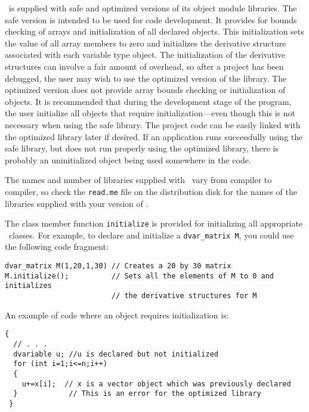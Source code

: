 \documentclass{admbmanual}
\begin{document}
\scAD\ is supplied with safe and optimized versions of its object module
libraries. The safe version is intended to be used for code development. It
provides for bounds checking of arrays and initialization of all declared
objects. This initialization sets the value of all array members to zero and
initializes the derivative structure associated with each variable type object.
The initialization of the derivative structures can involve a fair amount of
overhead, so after a project has been debugged, the user may wish to use the
optimized version of the library. The optimized version does not provide array
bounds checking or initialization of objects. It is recommended that during the
development stage of the program, the user initialize all objects that require
initialization---even though this is not necessary when using the safe library.
The project code can be easily linked with the optimized library later if
desired. If an application runs successfully using the safe library, but does
not run properly using the optimized library, there is probably an uninitialized
object being used somewhere in the code.

The names and number of libraries supplied with \scAD\ vary from compiler to
compiler, so check the \texttt{read.me} file on the distribution disk for the
names of the libraries supplied with your version of \scAD.

The class member function \texttt{initialize} is provided for initializing all
appropriate \scAD\ classes. For example, to declare and initialize a
\texttt{dvar\_matrix M}, you could use the following code fragment:
\begin{lstlisting}
dvar_matrix M(1,20,1,30) // Creates a 20 by 30 matrix
M.initialize();          // Sets all the elements of M to 0 and initializes
                         // the derivative structures for M
\end{lstlisting}

An example of code where an object requires initialization is:
\begin{lstlisting}
{
  // . . .
  dvariable u; //u is declared but not initialized
  for (int i=1;i<=n;i++)
  {
    u+=x[i];  // x is a vector object which was previously declared
  }            // This is an error for the optimized library
 }
\end{lstlisting}
\end{document}
